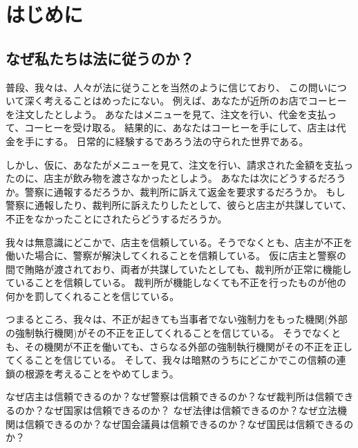 
\chapter{はじめに}

  \section{なぜ私たちは法に従うのか？} %
  
  普段、我々は、人々が法に従うことを当然のように信じており、
  この問いについて深く考えることはめったにない。
  例えば、あなたが近所のお店でコーヒーを注文したとしよう。
  あなたはメニューを見て、注文を行い、代金を支払って、コーヒーを受け取る。
  結果的に、あなたはコーヒーを手にして、店主は代金を手にする。
  日常的に経験するであろう法の守られた世界である。

  しかし、仮に、あなたがメニューを見て、注文を行い、請求された金額を支払ったのに、店主が飲み物を渡さなかったとしよう。
  あなたは次にどうするだろうか。警察に通報するだろうか、裁判所に訴えて返金を要求するだろうか。
  もし警察に通報したり、裁判所に訴えたりしたとして、彼らと店主が共謀していて、不正をなかったことにされたらどうするだろうか。
  
  我々は無意識にどこかで、店主を信頼している。そうでなくとも、店主が不正を働いた場合に、警察が解決してくれることを信頼している。
  仮に店主と警察の間で賄賂が渡されており、両者が共謀していたとしても、裁判所が正常に機能していることを信頼している。
  裁判所が機能しなくても不正を行ったものが他の何かを罰してくれることを信じている。

  つまるところ、我々は、不正が起きても当事者でない強制力をもった機関(外部の強制執行機関)がその不正を正してくれることを信じている。
  そうでなくとも、その機関が不正を働いても、さらなる外部の強制執行機関がその不正を正してくることを信じている。
  そして、我々は暗黙のうちにどこかでこの信頼の連鎖の根源を考えることをやめてしまう。

  なぜ店主は信頼できるのか？なぜ警察は信頼できるのか？なぜ裁判所は信頼できるのか？なぜ国家は信頼できるのか？
  なぜ法律は信頼できるのか？なぜ立法機関は信頼できるのか？なぜ国会議員は信頼できるのか？なぜ国民は信頼できるのか？


